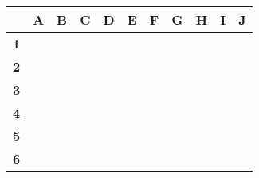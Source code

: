 \begin{table}[h]
\centering
\begin{tabular}{|l|l|l|l|l|l|l|l|l|l|l|}
\hline
            & \textbf{A} & \textbf{B} & \textbf{C}               & \textbf{D}               & \textbf{E}                                      & \textbf{F}                                      & \textbf{G}                                      & \textbf{H}                                      & \textbf{I} & \textbf{J}                                      \\ \hline
\textbf{1}  &            &            & \cellcolor[HTML]{000000} & \cellcolor[HTML]{000000} & \cellcolor[HTML]{000000}                        & \cellcolor[HTML]{000000}                        &                                                 &                                                 &            &                                                 \\ \hline
\textbf{2}  &            &            &                          &                          &                                                 &                                                 &                                                 & \cellcolor[HTML]{000000}{\color[HTML]{000000} } &            &                                                 \\ \hline
\textbf{3}  &            &            &                          &                          &                                                 &                                                 &                                                 & \cellcolor[HTML]{000000}{\color[HTML]{000000} } &            &                                                 \\ \hline
\textbf{4}  &            &            &                          &                          &                                                 &                                                 &                                                 &                                                 &            &                                                 \\ \hline
\textbf{5}  &            &            &                          &                          &                                                 &                                                 &                                                 &                                                 &            & \cellcolor[HTML]{000000}{\color[HTML]{000000} } \\ \hline
\textbf{6}  &            &            &                          &                          &                                                 &                                                 &                                                 &                                                 &            & \cellcolor[HTML]{000000}                        \\ \hline

\end{tabular}
\end{table}
